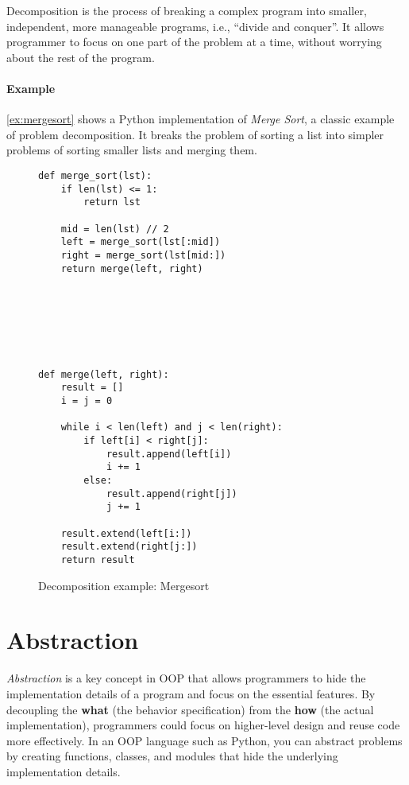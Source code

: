 \documentclass[oneside,11pt,dvipsnames]{book}
\begin{document}

Decomposition is the process of breaking a complex program into smaller, independent, more manageable programs, i.e., ``divide and conquer''. It allows programmer to focus on one part of the problem at a time, without worrying about the rest of the program.

\paragraph{Example} \autoref{ex:mergesort} shows a Python implementation of \emph{Merge Sort}, a classic example of problem decomposition. It breaks the problem of sorting a list into simpler problems of sorting smaller lists and merging them.

\begin{figure}[t]
\begin{lstlisting}[multicols=2]
def merge_sort(lst):
    if len(lst) <= 1:
        return lst

    mid = len(lst) // 2
    left = merge_sort(lst[:mid])
    right = merge_sort(lst[mid:])
    return merge(left, right)







def merge(left, right):
    result = []
    i = j = 0

    while i < len(left) and j < len(right):
        if left[i] < right[j]:
            result.append(left[i])
            i += 1
        else:
            result.append(right[j])
            j += 1

    result.extend(left[i:])
    result.extend(right[j:])
    return result
\end{lstlisting}
 \caption{Decomposition example: Mergesort}\label{ex:mergesort}
\end{figure}


\section{Abstraction}\label{sec:abstraction}



\emph{Abstraction} is a key concept in OOP that allows programmers to hide the implementation details of a program and focus on the essential features. By decoupling the \textbf{what} (the  behavior specification) from the \textbf{how} (the actual implementation), programmers could focus on higher-level design and reuse code more effectively.
In an OOP language such as Python, you can abstract problems by creating functions, classes, and modules that hide the underlying implementation details.
\end{document}
